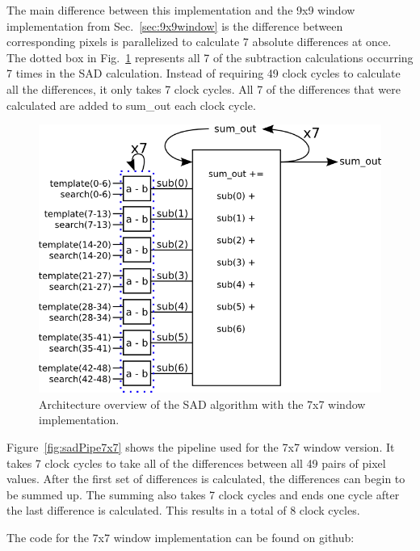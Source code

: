 The main difference between this implementation and the 9x9 window implementation from Sec.~\ref{sec:9x9window} is the difference between corresponding pixels is parallelized to calculate 7 absolute differences at once. The dotted box in Fig.~\ref{fig:sadAlg7x7} represents all 7 of the subtraction calculations occurring 7 times in the SAD calculation. Instead of requiring 49 clock cycles to calculate all the differences, it only takes 7 clock cycles. All 7 of the differences that were calculated are added to sum\_out each clock cycle.

\begin{figure}[h]
	\begin{center}
		\includegraphics[width=130mm]{figures/sadAlgorithm7x7.png}
		\captionfonts
		\caption{Architecture overview of the SAD algorithm with the 7x7 window implementation.}
		\label{fig:sadAlg7x7}
	\end{center}
\end{figure}

Figure~\ref{fig:sadPipe7x7} shows the pipeline used for the 7x7 window version. It takes 7 clock cycles to take all of the differences between all 49 pairs of pixel values. After the first set of differences is calculated, the differences can begin to be summed up. The summing also takes 7 clock cycles and ends one cycle after the last difference is calculated. This results in a total of 8 clock cycles.

The code for the 7x7 window implementation can be found on github:
\\

